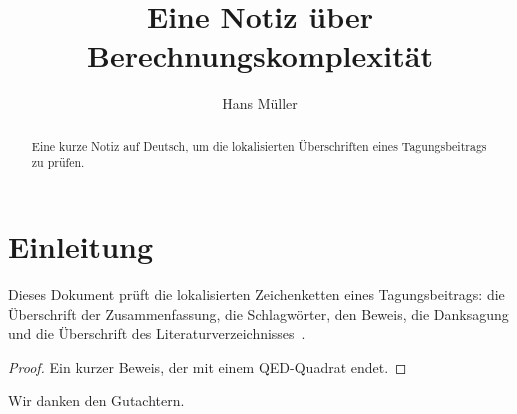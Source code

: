 \documentclass[sigplan,language=german]{acmart}
\begin{document}
\title{Eine Notiz über Berechnungskomplexität}

\author{Hans Müller}

\begin{abstract}
  Eine kurze Notiz auf Deutsch, um die lokalisierten Überschriften eines Tagungsbeitrags zu prüfen.
\end{abstract}


\maketitle

\section{Einleitung}
Dieses Dokument prüft die lokalisierten Zeichenketten eines Tagungsbeitrags: die Überschrift der Zusammenfassung, die Schlagwörter, den Beweis, die Danksagung und die Überschrift des Literaturverzeichnisses~\cite{Cohen07}.

\begin{proof}
Ein kurzer Beweis, der mit einem QED-Quadrat endet.
\end{proof}

\begin{acks}
Wir danken den Gutachtern.
\end{acks}



\end{document}
